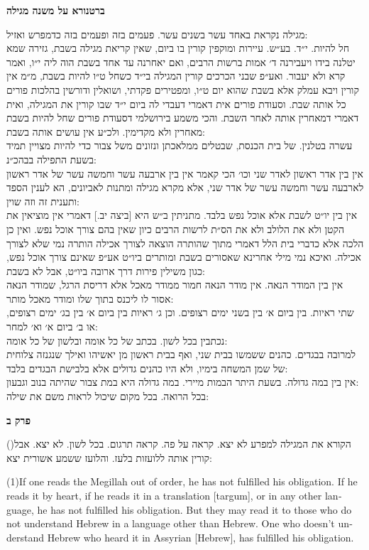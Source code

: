 \documentclass[12pt, openany]{book}
\newcommand{\sethebfont}{
\fontsize{10.5pt}{13.1pt} \selectfont
}
\newcommand{\hebeng}[2]{
	{\sethebfont #1\\}
	
	\begin{english}
		#2
	\end{english}
	\clearpage
}
\newcommand{\chapname}{}
\newcommand{\sectname}{}
\newcommand{\newchap}[1]{
	\addcontentsline{toc}{chapter}{#1}
	\renewcommand{\chapname}{#1}
		\begin{center}
			\textbf{%
\fontsize{16pt}{16pt}\selectfont
				#1}
		\end{center}
}
\newcommand{\newsection}[1]{
	\renewcommand{\sectname}{#1}	
	\vspace{-\baselineskip}
	\begin{center}
		\textbf{%
\fontsize{16pt}{16pt}\selectfont
			#1}
	\end{center}
	\vspace{-\baselineskip}
	\nopagebreak
}
\newcommand{\blockcomment}[2]{ 
\newsection{#1}
\sethebfont	#2}
\newcommand{\vsnum}[1]{(\hebrewnumeral{#1})\space}
\newcommand{\vsnumeng}[1]{(#1)\space}
\begin{document}
\clearpage
\blockcomment{ברטנורא על משנה מגילה}{מגילה נקראת באחד עשר בשנים עשר. פעמים בזה ופעמים בזה כדמפרש ואזיל:\\חל להיות. י״ד. בע״ש. עיירות ומוקפין קורין בו ביום, שאין קריאת מגילה בשבת, גזירה שמא יטלנה בידו ויעבירנה ד׳ אמות ברשות הרבים, ואם יאחרנה עד אחד בשבת הוה ליה י״ו, ואמר קרא ולא יעבור. ואע״פ שבני הכרכים קורין המגילה בי״ד כשחל ט״ו להיות בשבת, מ״מ אין קורין ויבא עמלק אלא בשבת שהוא יום ט״ו, ומפטירים פקדתי, ושואלין ודורשין בהלכות פורים כל אותה שבת. וסעודת פורים אית דאמרי דעבדי לה ביום י״ד שבו קורין את המגילה, ואית דאמרי דמאחרין אותה לאחר השבת. והכי משמע בירושלמי דסעודת פורים שחל להיות בשבת מאחרין ולא מקדימין. ולכ״ע אין עושים אותה בשבת:\\עשרה בטלנין. של בית הכנסת, שבטלים ממלאכתן ונזונים משל צבור כדי להיות מצויין תמיד בשעת התפילה בבהכ״נ:\\אין בין אדר ראשון לאדר שני וכו׳ הכי קאמר אין בין ארבעה עשר וחמשה עשר של אדר ראשון לארבעה עשר וחמשה עשר של אדר שני, אלא מקרא מגילה ומתנות לאביונים, הא לענין הספד ותענית זה וזה שוין: \\אין בין יו״ט לשבת אלא אוכל נפש בלבד. מתניתין ב״ש היא [ביצה יב.] דאמרי אין מוציאין את הקטן ולא את הלולב ולא את הס״ת לרשות הרבים כיון שאין בהם צורך אוכל נפש. ואין כן הלכה אלא כדברי בית הלל דאמרי מתוך שהותרה הוצאה לצורך אכילה הותרה נמי שלא לצורך אכילה. ואיכא נמי מילי אחרינא שאסורים בשבת ומותרים ביו״ט אע״פ שאינם צורך אוכל נפש, כגון משילין פירות דרך ארובה ביו״ט, אבל לא בשבת:\\אין בין המודר הנאה. אין מודר הנאה חמור ממודר מאכל אלא דריסת הרגל, שמודר הנאה אסור לו ליכנס בתוך שלו ומודר מאכל מותר:\\שתי ראיות. בין ביום א׳ בין בשני ימים רצופים. וכן ג׳ ראיות בין ביום א׳ בין בג׳ ימים רצופים, או ב׳ ביום א׳ וא׳ למחר:\\נכתבין בכל לשון. בכתב של כל אומה ובלשון של כל אומה:\\למרובה בבגדים. כהנים ששמשו בבית שני, ואף בבית ראשון מן יאשיהו ואילך שנגנזה צלוחית של שמן המשחה בימיו, ולא היו כהנים גדולים אלא בלבישת הבגדים בלבד:\\אין בין במה גדולה. בשעת היתר הבמות מיירי. במה גדולה היא במת צבור שהיתה בנוב וגבעון:\\בכל הרואה. בכל מקום שיכול לראות משם את שילה:\\\n}\clearpage %
\newchap{פרק ב}
\hebeng{\vsnum{1}הקורא את המגילה למפרע לא יצא. קראה על פה. קראה תרגום. בכל לשון. לא יצא. אבל קורין אותה ללועזות בלעז. והלועז ששמע אשורית יצא: }{\vsnumeng{1}If one reads the Megillah out of order, he has not fulfilled his obligation. If he reads it by heart, if he reads it in a translation {[targum]}, or in any other language, he has not fulfilled his obligation. But they may read it to those who do not understand Hebrew in a language other than Hebrew. One who doesn’t understand Hebrew who heard it in Assyrian {[Hebrew]}, has fulfilled his obligation.}%
\end{document}
